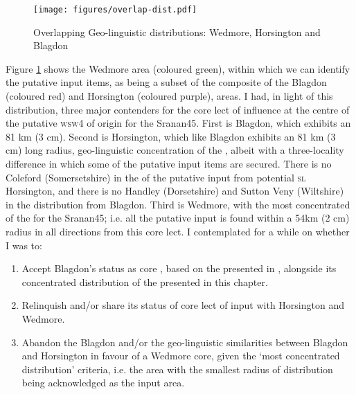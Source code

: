 \begin{figure}
\texttt{[image: figures/overlap-dist.pdf]}
\addtocounter{figure}{-1}\renewcommand{\thefigure}{\arabic{figure}.13}
\caption {Overlapping Geo-linguistic distributions: Wedmore, Horsington and Blagdon} 
\label{Map5.13}
\end{figure}

Figure \ref{Map5.13} shows the Wedmore area (coloured green), within which we can identify the putative input items, as being a subset of the composite of the Blagdon (coloured red) and Horsington (coloured purple), areas. I had, in light of this distribution, three major contenders for the core lect of influence at the centre of the putative \textsc{wsw4}  of origin for the Sranan45. First is Blagdon, which exhibits an 81 km (3 cm). Second is Horsington, which like Blagdon exhibits an 81 km (3 cm) long radius, geo-linguistic concentration of the , albeit with a three-locality difference in which some of the putative input items are secured. There is no Coleford (Somersetshire) in the  of the putative input from potential \textsc{sl} Horsington, and there is no Handley (Dorsetshire) and Sutton Veny (Wiltshire) in the distribution from Blagdon. Third is Wedmore, with the most concentrated  of the  for the Sranan45; i.e. all the putative input is found within a 54km (2 cm) radius in all directions from this core lect. I contemplated for a while on whether I was to:

\begin{enumerate}
\item {Accept Blagdon's status as core , based on the  presented in , alongside its concentrated distribution of the  presented in this chapter.}
\item{Relinquish and/or share its status of core lect of input with Horsington and Wedmore.}
\item{Abandon the Blagdon  and/or the geo-linguistic similarities between Blagdon and Horsington in favour of a Wedmore core, given the `most concentrated distribution' criteria, i.e. the area with the smallest radius of distribution being acknowledged as the input area.}
\end{enumerate}

